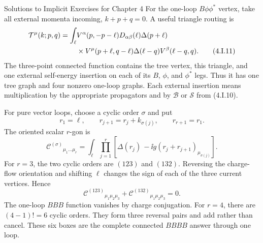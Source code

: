 \begin{bankssolutions}{Solutions to Implicit Exercises for Chapter 4}
For the one-loop $B\phi\phi^*$ vertex, take all external momenta incoming,
$k+p+q=0$.  A useful triangle routing is
\begin{align*}
 \mathcal T^\mu(k;p,q)
 =\int_\ell&
 V^\alpha(p,-p-\ell)D_{\alpha\beta}(\ell)
 \Delta(p+\ell)\notag\\
 &\times V^\mu(p+\ell,q-\ell)
 \Delta(\ell-q)V^\beta(\ell-q,q).
 \tag{4.I.11}
\end{align*}
The three-point connected function contains the tree vertex, this triangle,
and one external self-energy insertion on each of its $B$, $\phi$, and
$\phi^*$ legs.  Thus it has one tree graph and four nonzero one-loop graphs.
Each external insertion means multiplication by the appropriate propagators
and by $\mathcal B$ or $\mathcal S$ from (4.I.10).

For pure vector loops, choose a cyclic order $\sigma$ and put
\begin{equation*}
 r_1=\ell,
 \qquad r_{j+1}=r_j+k_{\sigma(j)},
 \qquad r_{r+1}=r_1.
\end{equation*}
The oriented scalar $r$-gon is
\begin{equation*}
 \mathcal C^{(\sigma)}{}_{\mu_1\ldots\mu_r}
 =\int_\ell\prod_{j=1}^r
 \left[
   \Delta(r_j)\,
   -\ii g(r_j+r_{j+1})_{\mu_{\sigma(j)}}
 \right].
 \tag{4.I.12}
\end{equation*}
For $r=3$, the two cyclic orders are $(123)$ and $(132)$.  Reversing the
charge-flow orientation and shifting $\ell$ changes the sign of each of the
three current vertices.  Hence
\begin{equation*}
 \mathcal C^{(123)}{}_{\mu_1\mu_2\mu_3}
 +\mathcal C^{(132)}{}_{\mu_1\mu_2\mu_3}=0.
 \tag{4.I.13}
\end{equation*}
The one-loop $BBB$ function vanishes by charge conjugation.  For $r=4$,
there are $(4-1)!=6$ cyclic orders.  They form three reversal pairs and add
rather than cancel.  These six boxes are the complete connected $BBBB$
answer through one loop.


\end{bankssolutions}
